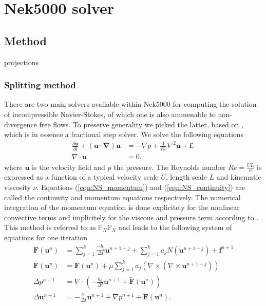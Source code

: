 \documentclass{sig-alternate}
\begin{document}



\section{Nek5000 solver}

\subsection{Method}
projections

\subsubsection{Splitting method}
There are two main solvers available within Nek5000 for computing the solution of incompressible Navier-Stokes, of which one is also ammenable to non-divergence free flows. To preserve generality we picked the latter, based on \cite{Tomboulides1997}, which is in essence a fractional step solver. We solve the following equations
\begin{align}
 \frac{\partial \mathbf{u}}{\partial t} + (\mathbf{u \cdot \nabla}) \mathbf{u} & = - \nabla p + \frac{1}{Re} \nabla^2 \mathbf{u} + \mathbf{f} \label{eqn:NS_momentum},\\
 \nabla \cdot \mathbf{u} & = 0, \label{eqn:NS_continuity}
\end{align}
where $\mathbf{u}$ is the velocity field and $p$ the pressure. The Reynolds number $Re = \frac{U L}{\nu}$ is expressed as a function of a typical velocity scale $U$, length scale $L$ and kinematic viscosity $\nu$. Equations (\ref{eqn:NS_momentum})  and (\ref{eqn:NS_continuity}) are called the continuity and momentum equations respectively. The numerical integration of the momentum equation is done explicitely for the nonlinear convective terms and implicitely for the viscous and pressure term according to \cite{Tomboulides1997}. This method is referred to as $\mathbb{P}_N\mathbb{P}_N$ and leads to the following system of equations for one iteration
\begin {align}
 \mathbf{F} \left( \mathbf{u}^{n} \right) & = \sum_{j=1}^{k} \frac{-b_j}{\Delta t} \mathbf{u}^{n+1-j} + \sum_{j=1}^{k} a_j N \left( \mathbf{u}^{n+1-j} \right) +  \mathbf{f}^{n+1} \label{eqn:rhs1}\\
 \mathbf{\tilde{F}} \left( \mathbf{u}^{n} \right) & = \mathbf{F}\left(\mathbf{u}^{n}\right) + \mu \sum_{j=1}^{k} a_j \left( \nabla \times \left( \nabla \times \mathbf{u}^{n+1-j} \right) \right) \label{eqn:rhs2} \\
 \Delta p^{n+1} & = \nabla \cdot \left( -\frac{b_0}{\Delta t} \mathbf{u}^{n+1} + \mathbf{\tilde{F}} \left( \mathbf{u}^{n} \right) \right) \label{eqn:hmhz_pres}\\
 \Delta \mathbf{u}^{n+1} & = - \frac{b_0}{\Delta t} \mathbf{u}^{n+1} + \nabla p^{n+1} + \mathbf{F} \left( \mathbf{u}^{n} \right). \label{eqn:hmhz_vel}
\end {align}
\end{document}
